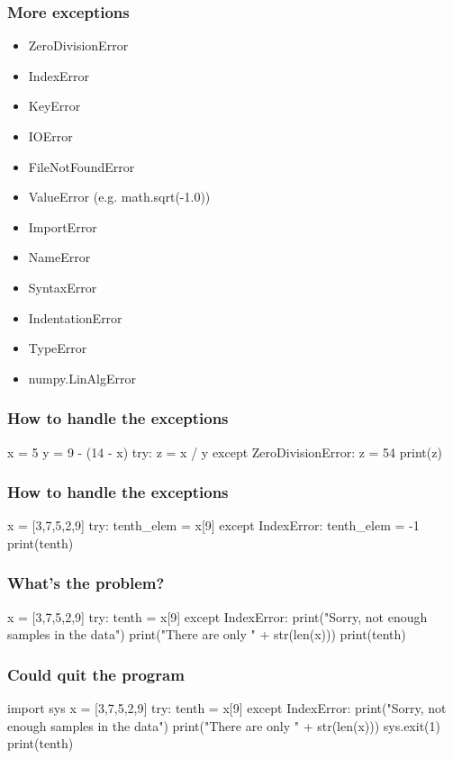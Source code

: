 \documentclass{beamer}
\begin{document}
\begin{frame}[fragile]
\frametitle{More exceptions}
\begin{itemize}
\item ZeroDivisionError
\item IndexError
\item KeyError
\item IOError
\item FileNotFoundError
\item ValueError (e.g. math.sqrt(-1.0))
\end{itemize}
\begin{itemize}
\item ImportError
\item NameError
\item SyntaxError
\item IndentationError
\item TypeError
\end{itemize}
\begin{itemize}
\item numpy.LinAlgError
\end{itemize}
\end{frame}

\begin{frame}[fragile]
\frametitle{How to handle the exceptions}
\begin{code}
x = 5
y = 9 - (14 - x)
try:
   z = x / y
except ZeroDivisionError:
   z = 54
print(z)
\end{code}
\end{frame}

\begin{frame}[fragile]
\frametitle{How to handle the exceptions}
\begin{code}
x = [3,7,5,2,9]
try:
   tenth_elem = x[9]
except IndexError:
   tenth_elem = -1
print(tenth)
\end{code}
\end{frame}

\begin{frame}[fragile]
\frametitle{What's the problem?}
\begin{code}
x = [3,7,5,2,9]
try:
   tenth = x[9]
except IndexError:
   print("Sorry, not enough samples in the data")
   print("There are only " + str(len(x)))
print(tenth)
\end{code}
\end{frame}

\begin{frame}[fragile]
\frametitle{Could quit the program}
\begin{code}
import sys
x = [3,7,5,2,9]
try:
   tenth = x[9]
except IndexError:
   print("Sorry, not enough samples in the data")
   print("There are only " + str(len(x)))
   sys.exit(1)
print(tenth)
\end{code}
\end{frame}
\end{document}
